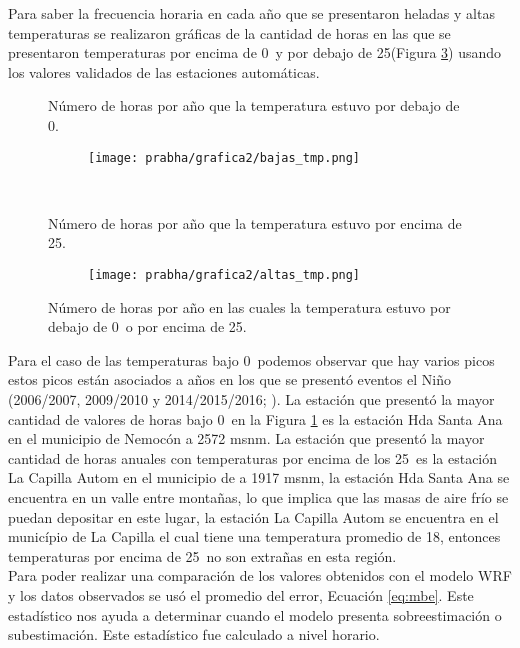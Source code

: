 
Para saber la frecuencia horaria en cada año que se presentaron heladas y altas temperaturas se realizaron gráficas de la cantidad de horas en las que se presentaron temperaturas por encima de 0\celc\ y por debajo de 25\celc (Figura \ref{subfig:temp_horarias_ext}) usando los valores validados de las estaciones automáticas.\\

\begin{figure}[H]
    \centering
    \caption{Número de horas por año que la temperatura estuvo por debajo de 0\celc.}
    \begin{subfigure}[b]{0.45\textwidth}
	\texttt{[image: prabha/grafica2/bajas\_tmp.png]}
    \label{subfig:tmp_0}
	\end{subfigure}
	~
    \caption{Número de horas por año que la temperatura estuvo por encima de 25\celc.}
    \begin{subfigure}[b]{0.45\textwidth}
	\texttt{[image: prabha/grafica2/altas\_tmp.png]}
    \label{subfig:tmp_25}
	\end{subfigure}

\caption{Número de horas por año en las cuales la temperatura estuvo por debajo de 0\celc\ o por encima de 25\celc.}	
\label{subfig:temp_horarias_ext}	
\end{figure}

Para el caso de las temperaturas bajo 0\celc\ podemos observar que hay varios picos estos picos están asociados a años en los que se presentó eventos el Niño (2006/2007, 2009/2010 y 2014/2015/2016; \citep{NOAA-ORI}). La estación que presentó la mayor cantidad de valores de horas bajo 0\celc\ en la Figura \ref{subfig:tmp_0} es la estación Hda Santa Ana en el municipio de Nemocón a 2572 msnm. La estación que presentó la mayor cantidad de horas anuales con temperaturas por encima de los 25\celc\ es la estación La Capilla Autom en el municipio de a 1917 msnm, la estación Hda Santa Ana se encuentra en un valle entre montañas, lo que implica que las masas de aire frío se puedan depositar en este lugar, la estación La Capilla Autom se encuentra en el município de La Capilla el cual tiene una temperatura promedio de 18\celc, entonces temperaturas por encima de 25\celc\ no son extrañas en esta región.\\

Para poder realizar una comparación de los valores obtenidos con el modelo WRF y los datos observados se usó el promedio del error, Ecuación \ref{eq:mbe}. Este estadístico nos ayuda a determinar cuando el modelo presenta sobreestimación o subestimación. Este estadístico fue calculado a nivel horario.

